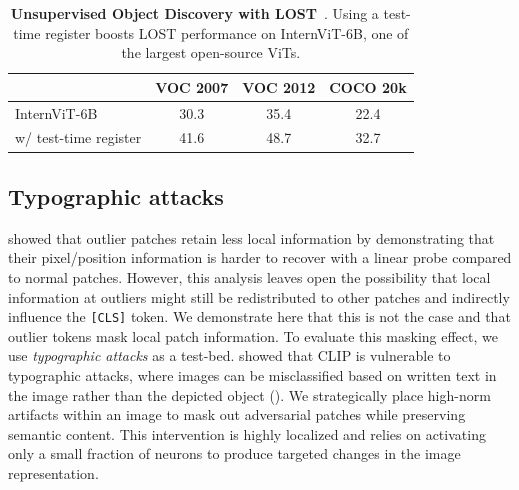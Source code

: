 \documentclass{article}
\begin{document}
\begin{table}[]
\centering
    \begin{tabular}{l|ccc}
    \toprule
        & VOC 2007 &  VOC 2012 & COCO 20k \\
        \midrule
       
        InternViT-6B & 30.3 & 35.4 & 22.4 \\
      
        w/ test-time register & 41.6 & 48.7 & 32.7 \\
        \bottomrule
    \end{tabular}
    \vspace{0.5em}
    \caption{\textbf{Unsupervised Object Discovery with LOST}~\citep{lost}. Using a test-time register boosts LOST performance on InternViT-6B, one of the largest open-source ViTs. } 
\label{tab:lost_internvit}
\end{table}






\subsection{Typographic attacks}
\label{typographic_attack}

\cite{darcet2024vision} showed that outlier patches retain less local information by demonstrating that their pixel/position information is harder to recover with a linear probe compared to normal patches. However, this analysis leaves open the possibility that local information at outliers might still be redistributed to other patches and indirectly influence the \texttt{[CLS]} token. We demonstrate here that this is not the case and that outlier tokens mask local patch information. To evaluate this masking effect, we use \textit{typographic attacks} as a test-bed. \cite{azuma2023defense} showed that CLIP is vulnerable to typographic attacks, where images can be misclassified based on written text in the image rather than the depicted object ().  We strategically place high-norm artifacts within an image to mask out adversarial patches while preserving semantic content. This intervention is highly localized and relies on activating only a small fraction of neurons to produce targeted changes in the image representation.
\end{document}
